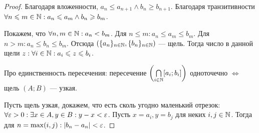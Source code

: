 \documentclass[a4paper]{report}
\begin{document}
    \begin{proof}
        Благодаря вложенности, $a_n \le a_{n+1} \land b_n \ge b_{n+1}$.
        Благодаря транзитивности $\forall n \leqslant m \in \mathbb{N}: a_n \leqslant a_m \land b_n \geqslant b_m$.

        Покажем, что $\forall n, m \in \mathbb{N}: a_n < b_m$.
        Для $n \le m: a_n \le a_m \le b_m$.
        Для $n > m: a_n \le b_n \le b_m$.
        Отсюда $\left(\{a_n\}_{n\in\mathbb{N}}, \{b_n\}_{n \in \mathbb{N}}\right)$ --- щель.
        Тогда число в данной щели $z: \forall i \in \mathbb{N}: a_i \leqslant z \leqslant b_i$.

        Про единственность пересечения: пересечение $\left(\underset{i \in \mathbb{N}}{\bigcap}[a_i; b_i]\right)$ одноточечно $\iff$ щель $(A; B)$  --- узкая.

        Пусть щель узкая, докажем, что есть сколь угодно маленький отрезок: $\forall \varepsilon > 0: \exists x \in A,  y \in B: y - x < \varepsilon$.
        Пусть $x = a_i, y =b_j$ для неких $i, j \in \mathbb{N}$.
        Тогда для $n = \max(i, j): |b_n - a_n| < \varepsilon$.
    \end{proof}
\end{document}

